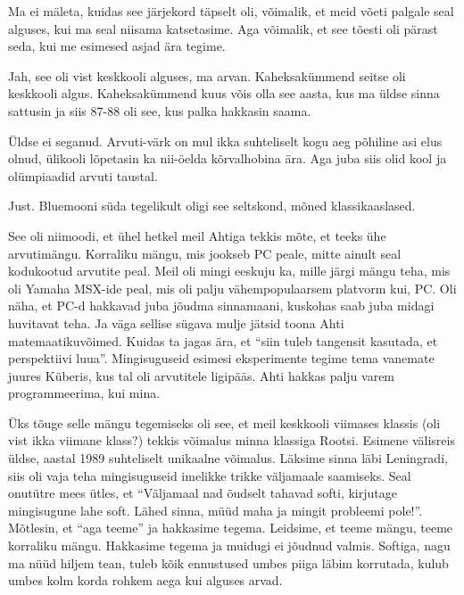 Ma ei mäleta, kuidas see järjekord täpselt oli, võimalik, et meid võeti palgale 
seal alguses, kui ma seal niisama katsetasime. Aga võimalik, et see tõesti oli 
pärast seda, kui me esimesed asjad ära tegime.


Jah, see oli vist keskkooli alguses, ma arvan. Kaheksakümmend seitse oli 
keskkooli algus. Kaheksakümmend kuus võis olla see aasta, kus ma üldse sinna 
sattusin ja siis 87-88 oli see, kus palka hakkasin saama. 


Üldse ei seganud. Arvuti-värk on mul ikka suhteliselt kogu aeg põhiline asi 
elus olnud, ülikooli lõpetasin ka nii-öelda kõrvalhobina ära. Aga juba siis 
olid kool ja olümpiaadid arvuti taustal.


Just. Bluemooni süda tegelikult oligi see seltskond, mõned klassikaaslased. 


See oli niimoodi, et ühel hetkel meil Ahtiga tekkis 
mõte, et teeks ühe arvutimängu. Korraliku mängu, mis jookseb PC peale, mitte 
ainult seal kodukootud arvutite peal. Meil oli mingi eeskuju ka, mille järgi  
mängu teha, mis oli Yamaha MSX-ide peal, mis oli 
palju vähempopulaarsem platvorm kui, PC. Oli näha, et PC-d hakkavad juba jõudma 
sinnamaani, kuskohas saab juba midagi huvitavat teha. Ja väga sellise sügava 
mulje jätsid toona Ahti matemaatikuvõimed. Kuidas ta jagas ära, et 
\enquote{siin tuleb tangensit kasutada, et  perspektiivi luua}. Mingisuguseid 
esimesi eksperimente tegime tema vanemate juures Küberis, kus tal 
oli arvutitele ligipääs. Ahti hakkas palju varem programmeerima, kui mina. 

Üks tõuge selle mängu tegemiseks oli see, et meil keskkooli viimases klassis 
(oli vist ikka viimane klass?) tekkis võimalus minna klassiga Rootsi. Esimene 
välisreis üldse, aastal 1989 suhteliselt unikaalne võimalus. Läksime sinna läbi 
Leningradi, siis oli vaja teha mingisuguseid imelikke trikke väljamaale 
saamiseks. Seal onutütre mees ütles, et \enquote{Väljamaal nad õudselt tahavad 
softi, kirjutage mingisugune lahe soft. Lähed sinna, müüd maha ja mingit 
probleemi pole!}. Mõtlesin, et \enquote{aga teeme} ja hakkasime tegema. 
Leidsime, et teeme mängu, teeme korraliku mängu. Hakkasime tegema ja muidugi ei 
jõudnud valmis. Softiga, nagu ma nüüd hiljem tean, tuleb kõik ennustused  umbes 
piiga läbim korrutada, kulub umbes kolm korda rohkem aega kui alguses arvad. 

